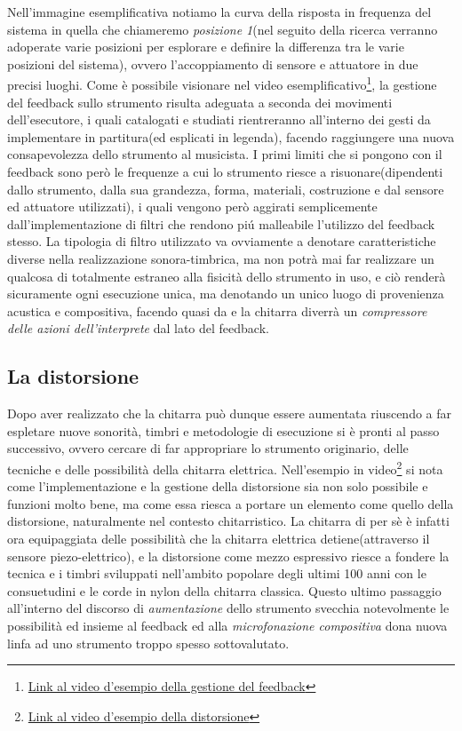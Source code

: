 \documentclass[oneside]{article}
\begin{document}
\begin{multicols*}{2}
Nell'immagine esemplificativa notiamo la curva della risposta in frequenza del sistema in quella che chiameremo \textit{posizione 1}(nel seguito della ricerca verranno adoperate varie posizioni per esplorare e definire la differenza tra le varie posizioni del sistema), ovvero l'accoppiamento di sensore e attuatore in due precisi luoghi. Come è possibile visionare nel video esemplificativo\footnote{\href{https://www.youtube.com/watch?v=7BwwTopM3Ek}{Link al video d'esempio della gestione del feedback}}, la gestione del feedback sullo strumento risulta adeguata a seconda dei movimenti dell'esecutore, i quali catalogati e studiati rientreranno all'interno dei gesti da implementare in partitura(ed esplicati in legenda), facendo raggiungere una nuova consapevolezza dello strumento al musicista. I primi limiti che si pongono con il feedback sono però le frequenze a cui lo strumento riesce a risuonare(dipendenti dallo strumento, dalla sua grandezza, forma, materiali, costruzione e dal sensore ed attuatore utilizzati), i quali vengono però aggirati semplicemente dall'implementazione di filtri che rendono piú malleabile l'utilizzo del feedback stesso. La tipologia di filtro utilizzato va ovviamente a denotare caratteristiche diverse nella realizzazione sonora-timbrica, ma non potrà mai far realizzare un qualcosa di totalmente estraneo alla fisicità dello strumento in uso, e ciò renderà sicuramente ogni esecuzione unica, ma denotando un unico luogo di provenienza acustica e compositiva, facendo quasi da e la chitarra diverrà un \textit{compressore delle azioni dell'interprete} dal lato del feedback.

\subsection{La distorsione} 
Dopo aver realizzato che la chitarra può dunque essere aumentata riuscendo a far espletare nuove sonorità, timbri e metodologie di esecuzione si è pronti al passo successivo, ovvero cercare di far appropriare lo strumento originario, delle tecniche e delle possibilità della chitarra elettrica. Nell'esempio in video\footnote{\href{https://www.youtube.com/watch?v=K3yqyxcJStg}{Link al video d'esempio della distorsione}} si nota come l'implementazione e la gestione della distorsione sia non solo possibile e funzioni molto bene, ma come essa riesca a portare un elemento come quello della distorsione, naturalmente nel contesto chitarristico. La chitarra di per sè è infatti ora equipaggiata delle possibilità che la chitarra elettrica detiene(attraverso il sensore piezo-elettrico), e la distorsione come mezzo espressivo riesce a fondere la tecnica e i timbri sviluppati nell'ambito popolare degli ultimi 100 anni con le consuetudini e le corde in nylon della chitarra classica. Questo ultimo passaggio all'interno del discorso di \textit{aumentazione} dello strumento svecchia notevolmente le possibilità ed insieme al feedback ed alla \textit{microfonazione compositiva} dona nuova linfa ad uno strumento troppo spesso sottovalutato.



\end{multicols*}
\end{document}
